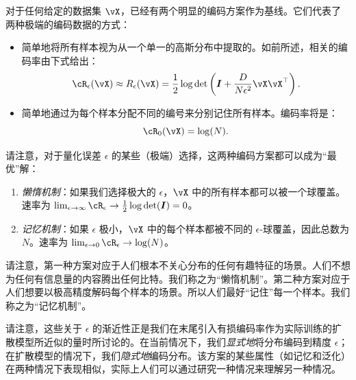 \documentclass[../../book-main_zh.tex]{subfiles}
\begin{document}
对于任何给定的数据集 $\vX$，已经有两个明显的编码方案作为基线。它们代表了两种极端的编码数据的方式：
\begin{itemize}
    \item 简单地将所有样本视为从一个单一的高斯分布中提取的。如前所述，相关的编码率由下式给出：
        \begin{equation}
            \cR_{\epsilon}(\vX) \approx R_{\epsilon}(\vX) =
            \frac{1}{2} \log \det \left(\boldsymbol{I} +
            \frac{D}{N\epsilon^2} \vX\vX^\top \right).
        \end{equation}
    \item 简单地通过为每个样本分配不同的编号来分别记住所有样本。编码率将是：
        \begin{equation}
            \cR_0(\vX) = \log(N).
        \end{equation}
\end{itemize}

请注意，对于量化误差 $\epsilon$ 的某些（极端）选择，这两种编码方案都可以成为“最优”解：
\begin{enumerate}
    \item {\em 懒惰机制}：如果我们选择极大的 $\epsilon$，$\vX$ 中的所有样本都可以被一个球覆盖。速率为  $\lim_{\epsilon \rightarrow \infty} \cR_\epsilon
        \rightarrow \frac{1}{2}\log\det (\boldsymbol{I}) = 0$。
    \item {\em 记忆机制}：如果 $\epsilon$ 极小，$\vX$ 中的每个样本都被不同的 $\epsilon$-球覆盖，因此总数为 $N$。速率为
        $\lim_{\epsilon \rightarrow 0} \cR_\epsilon \rightarrow \log(N)$。
\end{enumerate}
请注意，第一种方案对应于人们根本不关心分布的任何有趣特征的场景。人们不想为任何有信息量的内容腾出任何比特。我们称之为“懒惰机制”。第二种方案对应于人们想要以极高精度解码每个样本的场景。所以人们最好“记住”每一个样本。我们称之为“记忆机制”。

请注意，这些关于 \(\epsilon\) 的渐近性正是我们在末尾引入有损编码率作为实际训练的扩散模型所近似的量时所讨论的。在当前情况下，我们\textit{显式地}将分布编码到精度 \(\epsilon\)；在扩散模型的情况下，我们\textit{隐式地}编码分布。该方案的某些属性（如记忆和泛化）在两种情况下表现相似，实际上人们可以通过研究一种情况来理解另一种情况。
\end{document}
